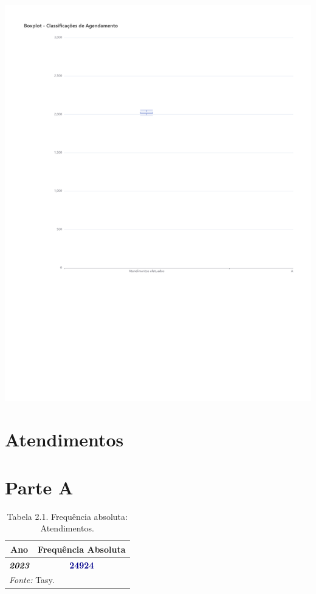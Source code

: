 \documentclass[
  letterpaper,
  DIV=11,
  numbers=noendperiod]{scrreprt}
\begin{document}
\includegraphics{2023_files/figure-pdf/unnamed-chunk-5-1.pdf}

\hypertarget{atendimentos-2}{%
\section*{Atendimentos}\label{atendimentos-2}}


\section{Parte A}

\begin{table}
\centering
\caption{Tabela 2.1. Frequência absoluta: Atendimentos.}
\centering
\begin{tabular}[t]{>{}c|>{}c}
\hline
Ano & Frequência Absoluta\\
\hline
\textcolor{black}{\em{\textbf{2023}}} & \textcolor{darkblue}{\textbf{24924}}\\
\hline
\multicolumn{2}{l}{\rule{0pt}{1em}\textit{Fonte: } Tasy.}\\
\end{tabular}
\end{table}
\end{document}
